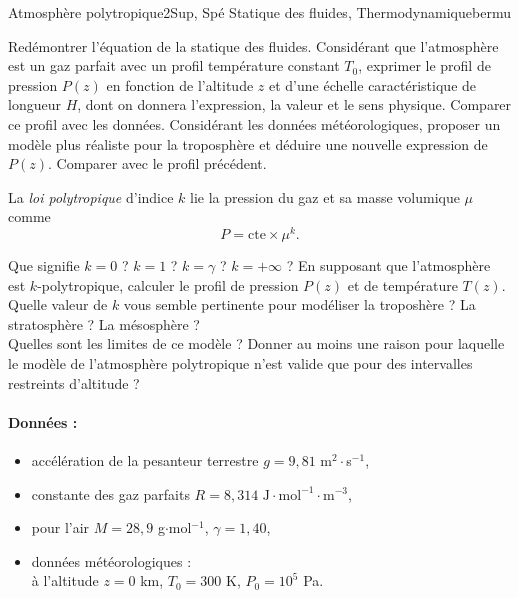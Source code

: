 
\begin{exercise}{Atmosphère polytropique}{2}{Sup, Spé}
{Statique des fluides, Thermodynamique}{bermu}

\begin{questions}
    \questioncours Redémontrer l'équation de la statique des fluides. 
    \question Considérant que l'atmosphère est un gaz parfait avec un profil température constant $T_0$, exprimer le profil de pression $P(z)$ en fonction de l'altitude $z$ et d'une échelle caractéristique de longueur $H$, dont on donnera l'expression, la valeur et le sens physique.
    \question Comparer ce profil avec les données.
    \question Considérant les données météorologiques, proposer un modèle plus réaliste pour la troposphère et déduire une nouvelle expression de $P(z)$. Comparer avec le profil précédent.
\begin{EnvUplevel}
La \emph{loi polytropique} d'indice $k$ lie la pression du gaz et sa masse volumique $\mu$ comme
$$P = \text{cte}\times\mu^k.$$
\end{EnvUplevel}
    \question Que signifie $k = 0$ ? $k = 1$ ? $k = \gamma$ ? $k = +\infty$ ?
    \question En supposant que l'atmosphère est $k$-polytropique, calculer le profil de pression $P(z)$ et de température $T(z)$.
    \question Quelle valeur de $k$ vous semble pertinente pour modéliser la troposhère ? La stratosphère ? La mésosphère ? \\
    Quelles sont les limites de ce modèle ?
    \questionbonus Donner au moins une raison pour laquelle le modèle de l'atmosphère polytropique n'est valide que pour des intervalles restreints d'altitude ?
\end{questions}

\paragraph{Données :}
\begin{itemize}
    \item accélération de la pesanteur terrestre $g = 9,81$ m$^2\cdot$s$^{-1}$,
    \item constante des gaz parfaits $R = 8,314$ $\mathrm{J\cdot mol^{-1}\cdot m^{-3}}$,
    \item pour l'air $M = 28,9$ g$\cdot$mol$^{-1}$, $\gamma = 1,40$,
    \item données météorologiques : \\
\quad à l'altitude $z=0$ km, $T_0=300$ K, $P_0 = 10^5$ Pa.


\end{itemize}
\end{exercise}
